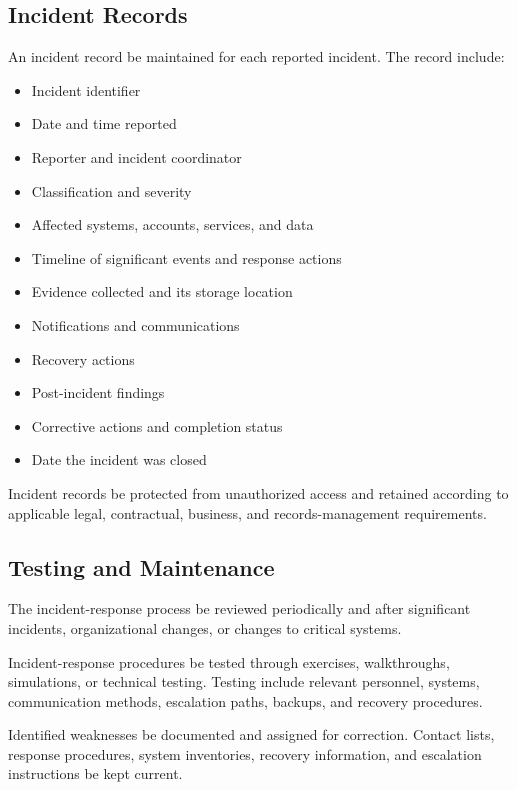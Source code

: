 \subsection{Incident Records}

An incident record \must{} be maintained for each reported incident. The record \should{} include:
\begin{itemize}
    \item Incident identifier
    \item Date and time reported
    \item Reporter and incident coordinator
    \item Classification and severity
    \item Affected systems, accounts, services, and data
    \item Timeline of significant events and response actions
    \item Evidence collected and its storage location
    \item Notifications and communications
    \item Recovery actions
    \item Post-incident findings
    \item Corrective actions and completion status
    \item Date the incident was closed
\end{itemize}

Incident records \must{} be protected from unauthorized access and retained according to applicable legal, contractual, business, and records-management requirements.

\subsection{Testing and Maintenance}

The incident-response process \must{} be reviewed periodically and after significant incidents, organizational changes, or changes to critical systems.

Incident-response procedures \should{} be tested through exercises, walkthroughs, simulations, or technical testing. Testing \should{} include relevant personnel, systems, communication methods, escalation paths, backups, and recovery procedures.

Identified weaknesses \must{} be documented and assigned for correction. Contact lists, response procedures, system inventories, recovery information, and escalation instructions \must{} be kept current.